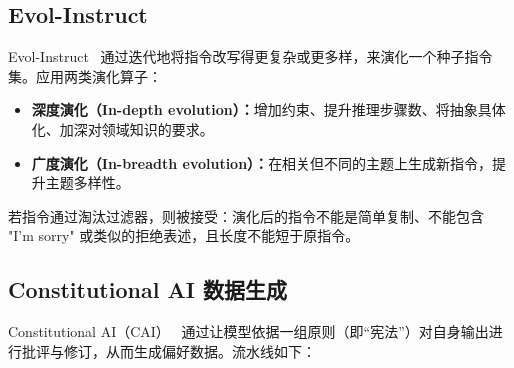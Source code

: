 \subsection{Evol-Instruct}
\label{evol-instruct}

Evol-Instruct~\cite{xu2023wizardlm} 通过迭代地将指令改写得更复杂或更多样，来演化一个种子指令集。应用两类演化算子：

\begin{itemize}
  \item \textbf{深度演化（In-depth evolution）：}增加约束、提升推理步骤数、将抽象具体化、加深对领域知识的要求。
  \item \textbf{广度演化（In-breadth evolution）：}在相关但不同的主题上生成新指令，提升主题多样性。
\end{itemize}

若指令通过淘汰过滤器，则被接受：演化后的指令不能是简单复制、不能包含 "I'm sorry" 或类似的拒绝表述，且长度不能短于原指令。

\subsection{Constitutional AI 数据生成}
\label{constitutional-ai-data-generation}

Constitutional AI（CAI）~\cite{bai2022constitutional} 通过让模型依据一组原则（即“宪法”）对自身输出进行批评与修订，从而生成偏好数据。流水线如下：

